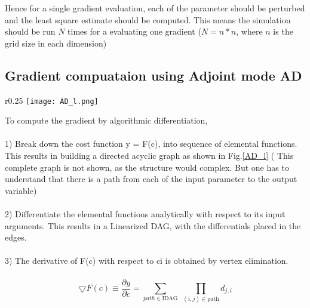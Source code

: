 \documentclass[10pt,a4paper]{report}
\begin{document}
Hence for a single gradient evaluation, each of the parameter should be perturbed and the least square estimate should be computed. This means the simulation should be run $N$ times for a evaluating one gradient ($N = n*n$, where $n$ is the grid size in each dimension) 


\subsection{Gradient compuataion using Adjoint mode AD}


\begin{wrapfigure}{r}{0.25\textwidth} %
    \centering
    \texttt{[image: AD\_l.png]}
    \caption{}
    \label{AD_l}
\end{wrapfigure}
To compute the gradient by algorithmic differentiation, \\
\\
1) Break down the cost function y = F(c), into sequence of elemental functions. This results in building a directed acyclic graph as shown in Fig.\ref{AD_l} ( This complete graph is not shown, as the structure would complex. But one has to understand that there is a path from each of the input parameter to the output variable)\\
\\
2) Differentiate the elemental functions analytically with respect to its input arguments. This results in a Linearized DAG, with the differentials placed in the edges.\\
\\
3) The derivative of F(c) with respect to ci is obtained by vertex elimination.\\
\\
\begin{equation}
\bigtriangledown F(c) \equiv \frac{\partial y}{\partial c}= \sum_{path \in \text{IDAG}} \; \prod_{(i,j)\in \text{path}} d_{j,i}  
\end{equation}
\end{document}
